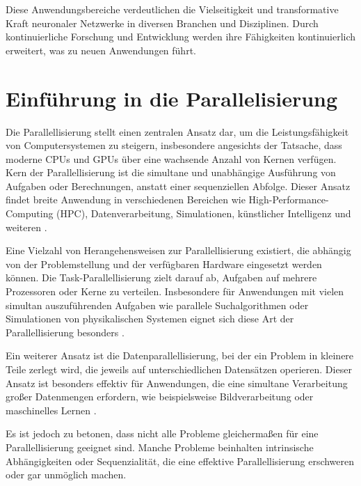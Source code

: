 Diese Anwendungsbereiche verdeutlichen die Vielseitigkeit und transformative Kraft neuronaler Netzwerke in diversen Branchen und Disziplinen. Durch kontinuierliche Forschung und Entwicklung werden ihre Fähigkeiten kontinuierlich erweitert, was zu neuen Anwendungen führt.


\section{Einführung in die Parallelisierung}
\label{sec:Grundlagen_Parallelisierung}
Die Parallellisierung stellt einen zentralen Ansatz dar, um die Leistungsfähigkeit von Computersystemen zu steigern, insbesondere angesichts der Tatsache, dass moderne CPUs und GPUs über eine wachsende Anzahl von Kernen verfügen. Kern der Parallellisierung ist die simultane und unabhängige Ausführung von Aufgaben oder Berechnungen, anstatt einer sequenziellen Abfolge. Dieser Ansatz findet breite Anwendung in verschiedenen Bereichen wie High-Performance-Computing (HPC), Datenverarbeitung, Simulationen, künstlicher Intelligenz und weiteren \citep{Flynn_Computer_Organizations_and_their_Effectiveness}.

Eine Vielzahl von Herangehensweisen zur Parallellisierung existiert, die abhängig von der Problemstellung und der verfügbaren Hardware eingesetzt werden können. Die Task-Parallellisierung zielt darauf ab, Aufgaben auf mehrere Prozessoren oder Kerne zu verteilen. Insbesondere für Anwendungen mit vielen simultan auszuführenden Aufgaben wie parallele Suchalgorithmen oder Simulationen von physikalischen Systemen eignet sich diese Art der Parallellisierung besonders \citep{Flynn_Computer_Organizations_and_their_Effectiveness}.

Ein weiterer Ansatz ist die Datenparallellisierung, bei der ein Problem in kleinere Teile zerlegt wird, die jeweils auf unterschiedlichen Datensätzen operieren. Dieser Ansatz ist besonders effektiv für Anwendungen, die eine simultane Verarbeitung großer Datenmengen erfordern, wie beispielsweise Bildverarbeitung oder maschinelles Lernen \citep{Flynn_Computer_Organizations_and_their_Effectiveness}.

Es ist jedoch zu betonen, dass nicht alle Probleme gleichermaßen für eine Parallellisierung geeignet sind. Manche Probleme beinhalten intrinsische Abhängigkeiten oder Sequenzialität, die eine effektive Parallellisierung erschweren oder gar unmöglich machen.

\subsection{Vor- und Nachteile von Parallelisierung}
\label{sec:Grundlagen_Parallelisierung_Vorteile_Nachteile}
Die Parallelisierung bietet eine Vielzahl von Vorteilen, die zur Leistungssteigerung von Computersystemen beitragen. Einer der offensichtlichsten Vorteile ist die Verbesserung der Ausführungsgeschwindigkeit von Programmen und Berechnungen durch die gleichzeitige Ausführung von Aufgaben oder die Verarbeitung von Daten auf mehreren Prozessoren oder Kernen. Diese beschleunigte Ausführung ist insbesondere bei rechenintensiven Anwendungen von Vorteil.

